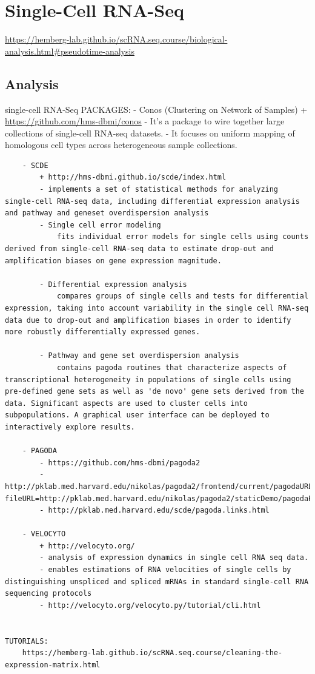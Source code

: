\documentclass[
]{book}
\begin{document}
\hypertarget{single-cell-rna-seq}{%
\section{Single-Cell RNA-Seq}\label{single-cell-rna-seq}}

\url{https://hemberg-lab.github.io/scRNA.seq.course/biological-analysis.html\#pseudotime-analysis}

\hypertarget{analysis}{%
\subsection{Analysis}\label{analysis}}

single-cell RNA-Seq
PACKAGES:
- Conos (Clustering on Network of Samples)
+ \url{https://github.com/hms-dbmi/conos}
- It's a package to wire together large collections of single-cell RNA-seq datasets.
- It focuses on uniform mapping of homologous cell types across heterogeneous sample collections.

\begin{verbatim}
    - SCDE
        + http://hms-dbmi.github.io/scde/index.html
        - implements a set of statistical methods for analyzing single-cell RNA-seq data, including differential expression analysis and pathway and geneset overdispersion analysis
        - Single cell error modeling
            fits individual error models for single cells using counts derived from single-cell RNA-seq data to estimate drop-out and amplification biases on gene expression magnitude.

        - Differential expression analysis
            compares groups of single cells and tests for differential expression, taking into account variability in the single cell RNA-seq data due to drop-out and amplification biases in order to identify more robustly differentially expressed genes.

        - Pathway and gene set overdispersion analysis
            contains pagoda routines that characterize aspects of transcriptional heterogeneity in populations of single cells using pre-defined gene sets as well as 'de novo' gene sets derived from the data. Significant aspects are used to cluster cells into subpopulations. A graphical user interface can be deployed to interactively explore results.

    - PAGODA
        - https://github.com/hms-dbmi/pagoda2
        - http://pklab.med.harvard.edu/nikolas/pagoda2/frontend/current/pagodaURL/index.html?fileURL=http://pklab.med.harvard.edu/nikolas/pagoda2/staticDemo/pagodaPublicDemo.bin
        - http://pklab.med.harvard.edu/scde/pagoda.links.html

    - VELOCYTO
        + http://velocyto.org/
        - analysis of expression dynamics in single cell RNA seq data.
        - enables estimations of RNA velocities of single cells by distinguishing unspliced and spliced mRNAs in standard single-cell RNA sequencing protocols
        - http://velocyto.org/velocyto.py/tutorial/cli.html


TUTORIALS:
    https://hemberg-lab.github.io/scRNA.seq.course/cleaning-the-expression-matrix.html
\end{verbatim}
\end{document}
